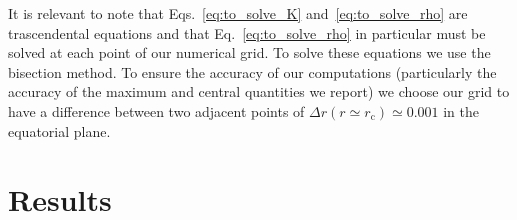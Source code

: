 \documentclass[twocolumn,aps,showpacs,showkeys,prd,superscriptaddress,byrevtex, amsmath]{revtex4-1}
\begin{document}
It is relevant to note that Eqs.~\eqref{eq:to_solve_K} and~\eqref{eq:to_solve_rho} are trascendental equations and that Eq.~\eqref{eq:to_solve_rho} in particular must be solved at each point of our numerical grid. To solve these equations we use the bisection method. To ensure the accuracy of our computations (particularly the accuracy of the maximum and central quantities we report) we choose our grid to have a difference between two adjacent points of $\Delta r (r \simeq r_{\mathrm{c}}) \simeq 0.001$ in the equatorial plane.



\section{Results}
\label{results}
\end{document}

